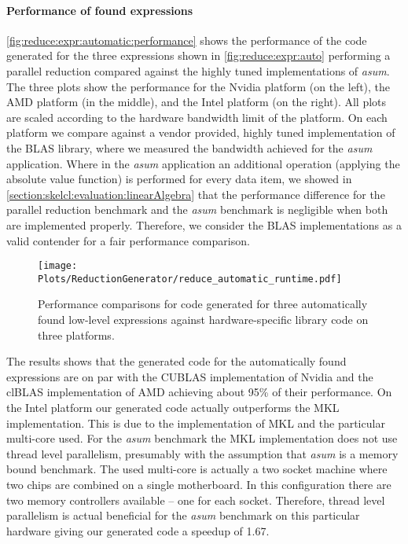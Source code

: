\paragraph{Performance of found expressions}
\autoref{fig:reduce:expr:automatic:performance} shows the performance of the code generated for the three expressions shown in \autoref{fig:reduce:expr:auto} performing a parallel reduction compared against the highly tuned implementations of \emph{asum}.
The three plots show the performance for the Nvidia platform (on the left), the AMD platform (in the middle), and the Intel platform (on the right).
All plots are scaled according to the hardware bandwidth limit of the platform.
On each platform we compare against a vendor provided, highly tuned implementation of the BLAS library, where we measured the bandwidth achieved for the \emph{asum} application.
Where in the \emph{asum} application an additional operation (applying the absolute value function) is performed for every data item, we showed in \autoref{section:skelcl:evaluation:linearAlgebra} that the performance difference for the parallel reduction benchmark and the \emph{asum} benchmark is negligible when both are implemented properly.
Therefore, we consider the BLAS implementations as a valid contender for a fair performance comparison.

\begin{figure}
  \centering
  \texttt{[image: Plots/ReductionGenerator/reduce\_automatic\_runtime.pdf]}
  \caption{Performance comparisons for code generated for three automatically found low-level expressions against hardware-specific library code on three platforms.}
  \label{fig:reduce:expr:automatic:performance}
\end{figure}

The results shows that the generated code for the automatically found expressions are on par with the CUBLAS implementation of Nvidia and the clBLAS implementation of AMD achieving about 95\% of their performance.
On the Intel platform our generated code actually outperforms the MKL implementation.
This is due to the implementation of MKL and the particular multi-core \CPU used.
For the \emph{asum} benchmark the MKL implementation does not use thread level parallelism, presumably with the assumption that \emph{asum} is a memory bound benchmark.
The used multi-core \CPU is actually a two socket machine where two chips are combined on a single motherboard.
In this configuration there are two memory controllers available -- one for each socket.
Therefore, thread level parallelism is actual beneficial for the \emph{asum} benchmark on this particular hardware giving our generated code a speedup of 1.67.

